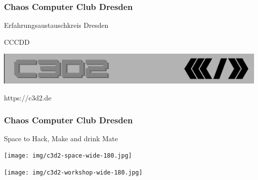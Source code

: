\documentclass[12pt]{beamer}
\begin{document}
\begin{frame}	
	\frametitle{Chaos Computer Club Dresden}
	\begin{center}
		Erfahrungsaustauschkreis Dresden
		\vspace{0.4cm}

		CCCDD
		\vspace{0.4cm}

		\includegraphics[height=0.1\textheight]{img/c3d2_logo.png}		
		\vspace{0.4cm}

		https://c3d2.de

	\end{center}
\end{frame}	

\begin{frame}	
	\frametitle{Chaos Computer Club Dresden}
	\begin{center}
		Space to Hack, Make and drink Mate
		\vspace{0.4cm}

		\texttt{[image: img/c3d2-space-wide-180.jpg]}
		
		\texttt{[image: img/c3d2-workshop-wide-180.jpg]}
	\end{center}
\end{frame}	
\end{document}
